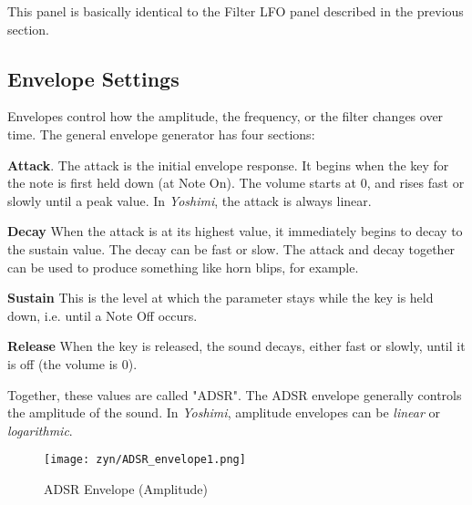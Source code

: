    This panel is basically identical to the Filter LFO panel described
   in the previous section.


\subsection{Envelope Settings}
\label{subsec:envelope_settings}

   Envelopes control how the amplitude, the frequency, or the filter changes
   over time.  The general envelope generator has four sections:

   \begin{enumber}
      \item \textbf{Attack}.
         \label{ref:attack}
         The attack is the initial envelope response.
         It begins when the key for the note is first held down
         (at Note On).
         The volume starts at 0, and rises fast or slowly until a peak value.
         In \textsl{Yoshimi}, the attack is always linear.
      \item \textbf{Decay}
         \label{ref:decay}
         When the attack is at its highest value, it immediately begins
         to decay to the sustain value.  The decay can be fast or slow.
         The attack and decay together can be used to produce something like
         horn blips, for example.
      \item \textbf{Sustain}
         \label{ref:sustain}
         This is the level at which the parameter stays while the key is
         held down, i.e. until a Note Off occurs.
      \item \textbf{Release}
         \label{ref:release}
         When the key is released, the sound decays, either fast or slowly,
         until it is off (the volume is 0).
   \end{enumber}

   Together, these values are called "ADSR".
   The ADSR envelope generally controls the amplitude of the sound.
   In \textsl{Yoshimi},
   amplitude envelopes can be \textsl{linear} or \textsl{logarithmic}.

\begin{figure}[H]
   \centering
   \texttt{[image: zyn/ADSR\_envelope1.png]}
   \caption{ADSR Envelope (Amplitude)}
   \label{fig:adsr_envelope_depiction}
\end{figure}

